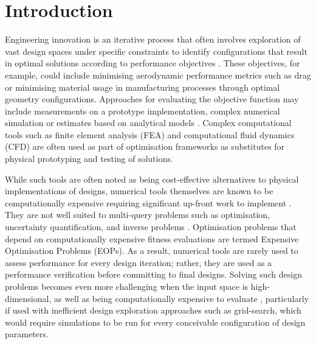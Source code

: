 \documentclass{article}
\begin{document}
\tableofcontents
\newpage          %

\listoffigures
{}

\newpage

\listoftables
{}
\newpage

\section{Introduction}

Engineering innovation is an iterative process that often involves exploration of vast design spaces under specific constraints to identify configurations that result in optimal solutions according to performance objectives \citep{Yamada2022}. These objectives, for example, could include minimising aerodynamic performance metrics such as drag or minimising material usage in manufacturing processes through optimal geometry configurations. Approaches for evaluating the objective function may include measurements on a prototype implementation, complex numerical simulation or estimates based on analytical models \citep{Pimentel2022}. Complex computational tools such as finite element analysis (FEA) and computational fluid dynamics (CFD) \citep{Archbold2024} are often used as part of optimisation frameworks as substitutes for physical prototyping and testing of solutions. 

While such tools are often noted as being cost-effective alternatives to physical implementations of designs, numerical tools themselves are known to be computationally expensive requiring significant up-front work to implement \citep{Shi2010}. They are not well suited to multi-query problems such as optimisation, uncertainty quantification, and inverse problems \citep{Archbold2024}. Optimisation problems that depend on computationally expensive fitness evaluations are termed Expensive Optimisation Problems (EOPs)\citep{Ren2025}. As a result, numerical tools are rarely used to assess performance for every design iteration; rather, they are used as a performance verification before committing to final designs. Solving such design problems becomes even more challenging when the input space is high-dimensional, as well as being computationally expensive to evaluate \citep{Tripp2020}, particularly if used with inefficient design exploration approaches such as grid-search, which would require simulations to be run for every conceivable configuration of design parameters. 
\end{document}
